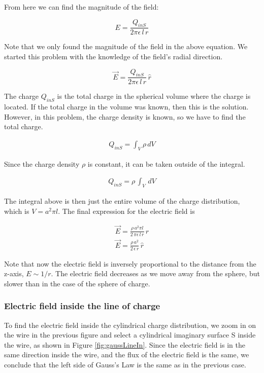 \documentclass{ximera}
\begin{document}
From here we can find the magnitude of the field:


\begin{equation}
 E  = \frac{Q_{inS}}{2 \pi  \epsilon \, l\, r}
\end{equation}

Note that we only found the magnitude of the field in the above equation. We started this problem with the knowledge of the field's radial direction. 

\begin{equation}
 \vec{E}  = \frac{Q_{inS}}{2 \pi  \epsilon \, l\, r} \, \hat{r}
\end{equation}

 The charge $Q_{inS}$ is the total charge in the spherical volume where the charge is located. If the total charge in the volume was known, then this is the solution. However, in this problem, the charge density is known, so we have to find the total charge.

\begin{eqnarray}
Q_{inS}=\int_V \rho \, dV
\end{eqnarray}

Since the charge density $\rho$ is constant, it can be taken outside of the integral.


\begin{eqnarray}
Q_{inS}=\rho \, \int_V \, dV
\end{eqnarray}

The integral above is then just the entire volume of the charge distribution, which is $V= a^2 \pi l$. The final expression for the electric field is 


\begin{eqnarray}
 \vec{E}  = \frac{\rho \, a^2 \pi l }{2 \, \pi  \epsilon \, l \,r} \, \hat{r} \\
 \vec{E}  = \frac{\rho \,   a^2}{2 \, \epsilon \, r} \, \hat{r}
\end{eqnarray}


Note that now the electric field is inversely proportional to the distance from the z-axis, $E \sim 1/r$. The electric field decreases as we move away from the sphere, but slower than in the case of the sphere of charge.


\subsubsection{Electric field inside the line of charge}

To find the electric field inside the cylindrical charge distribution, we zoom in on the wire in the previous figure and select a cylindrical imaginary surface S inside the wire, as shown in Figure \ref{fig:gaussLineIn}. Since the electric field is in the same direction inside the wire, and the flux of the electric field is the same, we conclude that the left side of Gauss's Law is the same as in the previous case. 
\end{document}
